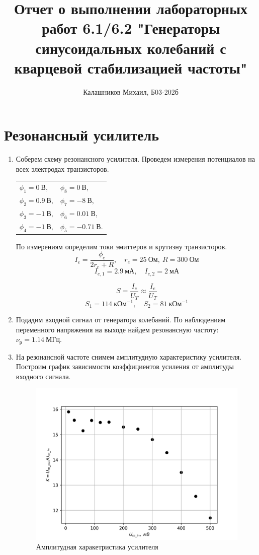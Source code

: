 \documentclass[14pt, a4paper]{article}
\title{\textbf{Отчет о выполнении лабораторных работ 6.1/6.2 "Генераторы синусоидальных колебаний с кварцевой стабилизацией частоты"}}
\author{Калашников Михаил, Б03-202б}
\date{}
\begin{document}
\maketitle

\section{Резонансный усилитель}

\begin{enumerate}

\item Соберем схему резонансного усилителя. Проведем измерения потенциалов на всех электродах транзисторов.

\begin{table}[H]
\centering
\begin{tabular}{ll}
$\phi_1=0\ В$, & $\phi_8=0\ В$, \\
$\phi_2=0.9\ В$, & $\phi_7=-8\ В$, \\
$\phi_3=-1\ В$, & $\phi_6=0.01\ В$, \\
$\phi_4=-1\ В$, & $\phi_5=-0.71\ В$. \\
\end{tabular}
\end{table}

По измерениям определим токи эмиттеров и крутизну транзисторов.
\[I_e=\frac{\phi_e}{2r_e+R},\quad r_e=25\ Ом,\ R=300\ Ом\]
\[I_{e, 1}=2.9\ мА,\quad I_{e, 2}=2\ мА\]

\[S=\frac{I_c}{U_T}\approx\frac{I_e}{U_T}\]
\[S_1=114\ кОм^{-1},\quad S_2=81\ кОм^{-1}\]

\item Подадим входной сигнал от генератора колебаний. По наблюдениям переменного напряжения на выходе найдем резонансную частоту: $\nu_р=1.14\ МГц$.

\item На резонансной частоте снимем амплитудную характеристику усилителя. Построим график зависимости коэффициентов усиления от амплитуды входного сигнала.

\begin{figure}[H]
\centering
\includegraphics[scale=0.6]{../images/rt1-1}
\caption{Амплитудная харакетристика усилителя}
\end{figure}


\end{enumerate}
\end{document}
